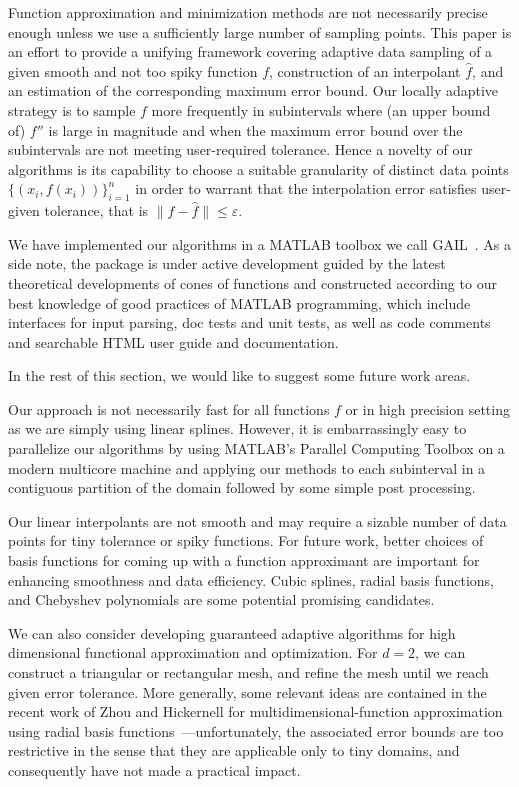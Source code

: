 \documentclass[review]{elsarticle}
\newcommand{\abstol}{\varepsilon}
\theoremstyle{definition}
\begin{document}
Function approximation and minimization methods are not necessarily precise
enough unless we use a sufficiently large number of sampling points. This paper
is an effort to provide a unifying framework covering adaptive data sampling of
a given smooth and not too spiky function $f$, construction of an interpolant
$\hat{f}$, and an estimation of the corresponding maximum error bound. Our
locally adaptive strategy is to sample $f$ more frequently in subintervals where
(an upper bound of) $f''$ is large in magnitude and when the maximum error bound
over the subintervals are not meeting user-required tolerance. Hence a novelty
of our algorithms is its capability to choose a suitable granularity of distinct
data points $\{(x_i, f(x_i))\}_{i=1}^n$ in order to warrant that the
interpolation error satisfies user-given tolerance, that is $\| f - \hat{f} \|
\le \abstol$.

We have implemented our algorithms in a MATLAB toolbox we call
GAIL~\cite{ChoEtal15a}. As a side note, the package is under active development
guided by the latest theoretical developments of cones of functions and
constructed according to our best knowledge of good practices of MATLAB
programming, which include interfaces for input parsing, doc tests and unit
tests, as well as code comments and searchable HTML user guide and
documentation.

In the rest of this section, we would like to suggest some future work areas.

Our approach is not necessarily fast for all functions $f$ or in high precision
setting as we are simply using linear splines. However, it is embarrassingly
easy to parallelize our algorithms by using MATLAB's Parallel Computing Toolbox
on a modern multicore machine and applying our methods to each subinterval in a
contiguous partition of the domain followed by some simple post processing.

Our linear interpolants are not smooth and may require a sizable number of data
points for tiny tolerance or spiky functions. For future work, better choices of
basis functions for coming up with a function approximant are important for
enhancing smoothness and data efficiency. Cubic splines, radial basis functions,
and Chebyshev polynomials are some potential promising candidates.

We can also consider developing guaranteed adaptive algorithms for high
dimensional functional approximation and optimization. For $d=2$, we can
construct a triangular or rectangular mesh, and refine the mesh until we reach
given error tolerance. More generally, some relevant ideas are contained in the
recent work of Zhou and Hickernell for multidimensional-function approximation
using radial basis functions~\cite{ZhoHic15a}---unfortunately, the associated
error bounds are too restrictive in the sense that they are applicable only to
tiny domains, and consequently have not made a practical impact.
\end{document}
